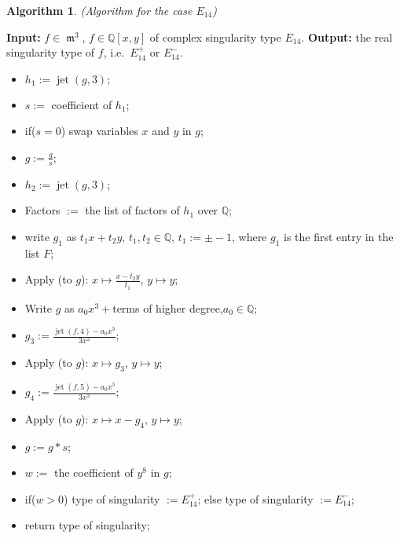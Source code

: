 \documentclass[noend]{amsproc}
\DeclareMathOperator{\m}{\mathfrak{m}}
\DeclareMathOperator{\jt}{jet}
\begin{document}
\newtheorem{E[14]}[kjet]{Algorithm}
\begin{E[14]}(Algorithm for the case $E_{14}$)\label{E[14]}
\end{E[14]}
\noindent\textnormal{\bf Input:} $f\in \m^3$, $f\in\mathbb Q[x,y]$ of complex
singularity type $E_{14}$.\newline
\textnormal{\bf Output:} the real singularity type of $f$, i.e.~$E_{14}^+$ or
$E_{14}^-$.
\begin{itemize}
\item $h_1 :=\jt(g,3);$
\item $s :=$ coefficient of $h_1$;
\item if($s=0$)\newline
\phantom{}\quad swap variables $x$ and $y$ in $g$;
\item $g := \frac{g}{s}$;
\item $h_2 :=\jt(g,3)$;
\item Factors $:=$ the list of factors of $h_1$ over $\mathbb Q$;
\item write $g_1$ as $t_1x+t_2y$, $t_1,t_2\in\mathbb Q$, $t_1 := \pm-1$, where
$g_1$ is the first entry in the list $F$;
\item Apply (to $g$): $x\mapsto \frac{x-t_2y}{t_1}$, $y\mapsto y$;
\item Write $g$ as $a_0x^3+ $terms of higher degree,\quad$a_0\in\mathbb Q$;
\item $g_3:=\frac{\jt(f,4)-a_0x^3}{3x^2}$;
\item Apply (to $g$): $x\mapsto g_3$, $y\mapsto y$;
\item $g_4:=\frac{\jt(f,5)-a_0x^3}{3x^2}$;
\item Apply (to $g$): $x\mapsto x-g_4$, $y\mapsto y$;
\item $g := g*s$;
\item $w:=$ the coefficient of $y^8$ in $g$;
\item if($w>0$)\newline
\phantom{}\quad type of singularity $:= E_{14}^+$;\newline
 else\newline
\phantom{}\quad type of singularity $:= E_{14}^-$;
\item return type of singularity;
\end{itemize}
\end{document}
